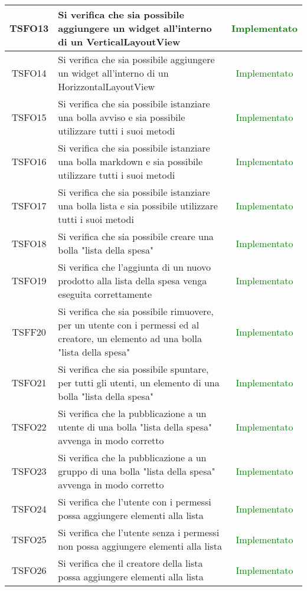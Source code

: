 \begin{center}
\begin{longtable}{|c|>{\centering}m{10cm}|c|}
		TSFO13 & Si verifica che sia possibile aggiungere un widget all'interno di un VerticalLayoutView & \textcolor{Green}{Implementato}\\ \hline
		TSFO14 & Si verifica che sia possibile aggiungere un widget all'interno di un HorizzontalLayoutView & \textcolor{Green}{Implementato}\\ \hline
		TSFO15 & Si verifica che sia possibile istanziare una bolla avviso e sia possibile utilizzare tutti i suoi metodi & \textcolor{Green}{Implementato}\\ \hline
		TSFO16 & Si verifica che sia possibile istanziare una bolla markdown e sia possibile utilizzare tutti i suoi metodi & \textcolor{Green}{Implementato}\\ \hline
		TSFO17 & Si verifica che sia possibile istanziare una bolla lista e sia possibile utilizzare tutti i suoi metodi & \textcolor{Green}{Implementato}\\ \hline
		TSFO18 & Si verifica che sia possibile creare una bolla "lista della spesa" & \textcolor{Green}{Implementato}\\ \hline
		TSFO19 & Si verifica che l'aggiunta di un nuovo prodotto alla lista della spesa venga eseguita correttamente & \textcolor{Green}{Implementato}\\ \hline
		TSFF20 & Si verifica che sia possibile rimuovere, per un utente con i permessi ed al creatore, un elemento ad una bolla "lista della spesa" & \textcolor{Green}{Implementato}\\ \hline
		TSFO21 & Si verifica che sia possibile spuntare, per tutti gli utenti, un elemento di una bolla "lista della spesa" & \textcolor{Green}{Implementato}\\ \hline
		TSFO22 & Si verifica che la pubblicazione a un utente di una bolla "lista della spesa" avvenga in modo corretto & \textcolor{Green}{Implementato}\\ \hline
		TSFO23 & Si verifica che la pubblicazione a un gruppo di una bolla "lista della spesa" avvenga in modo corretto & \textcolor{Green}{Implementato}\\ \hline
		TSFO24 & Si verifica che l'utente con i permessi possa aggiungere elementi alla lista & \textcolor{Green}{Implementato}\\ \hline
		TSFO25 & Si verifica che l'utente senza i permessi non possa aggiungere elementi alla lista & \textcolor{Green}{Implementato}\\ \hline
		TSFO26 & Si verifica che il creatore della lista possa aggiungere elementi alla lista & \textcolor{Green}{Implementato}\\ \hline
	\end{longtable}
\end{center}
